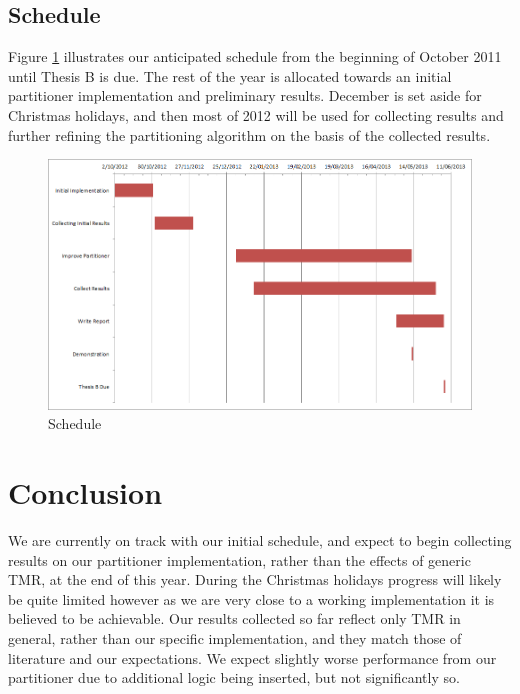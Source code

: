 \documentclass[12pt,final,oneside]{dwThesis} %
\begin{document}
   \section{Schedule}
   Figure \ref{Schedule} illustrates our anticipated schedule from the beginning of October 2011 until Thesis B is due. The rest of the year is allocated towards an initial partitioner implementation and preliminary results. December is set aside for Christmas holidays, and then most of 2012 will be used for collecting results and further refining the partitioning algorithm on the basis of the collected results.
   \begin{figure}
      \begin{center}
         \includegraphics[width=\textwidth]{images/schedule.png}
         \caption{Schedule}
         \label{Schedule}
      \end{center}
   \end{figure}

   \chapter{Conclusion}
   We are currently on track with our initial schedule, and expect to begin collecting results on our partitioner implementation, rather than the effects of generic \ac{TMR}, at the end of this year. During the Christmas holidays progress will likely be quite limited however as we are very close to a working implementation it is believed to be achievable.
   Our results collected so far reflect only \ac{TMR} in general, rather than our specific implementation, and they match those of literature and our expectations. We expect slightly worse performance from our partitioner due to additional logic being inserted, but not significantly so.
\end{document}
